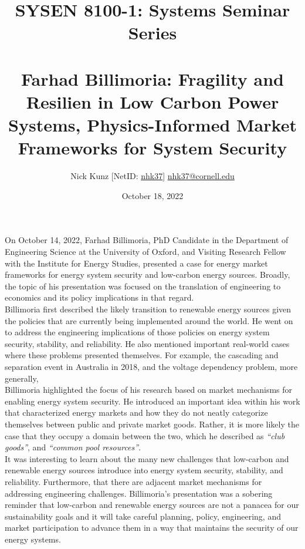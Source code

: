 \documentclass[11pt]{article}
\begin{document}
\title{SYSEN 8100-1: Systems Seminar Series\\~\\
    \Large Farhad Billimoria: Fragility and Resilien in Low Carbon Power Systems, Physics-Informed Market Frameworks for System Security
}
\author{
    Nick Kunz [NetID: \url{nhk37}] \hyperlink{nhk37@cornell.edu}{nhk37@cornell.edu}
}
\date{October 18, 2022}
\maketitle

On October 14, 2022, Farhad Billimoria, PhD Candidate in the Department of Engineering Science at the University of Oxford, and Visiting Research Fellow with the Institute for Energy Studies, presented a case for energy market frameworks for energy system security and low-carbon energy sources. Broadly, the topic of his presentation was focused on the translation of engineering to economics and its policy implications in that regard. \\

Billimoria first described the likely transition to renewable energy sources given the policies that are currently being implemented around the world. He went on to address the engineering implications of those policies on energy system security, stability, and reliability. He also mentioned important real-world cases where these problems presented themselves. For example, the cascading and separation event in Australia in 2018, and the voltage dependency problem, more generally, \\

Billimoria highlighted the focus of his research based on market mechanisms for enabling energy system security. He introduced an important idea within his work that characterized energy markets and how they do not neatly categorize themselves between public and private market goods. Rather, it is more likely the case that they occupy a domain between the two, which he described as \textit{``club goods''}, and \textit{``common pool resources''}. \\

It was interesting to learn about the many new challenges that low-carbon and renewable energy sources introduce into energy system security, stability, and reliability. Furthermore, that there are adjacent market mechanisms for addressing engineering challenges. Billimoria's presentation was a sobering reminder that low-carbon and renewable energy sources are not a panacea for our sustainability goals and it will take careful planning, policy, engineering, and market participation to advance them in a way that maintains the security of our energy systems.
\end{document}
